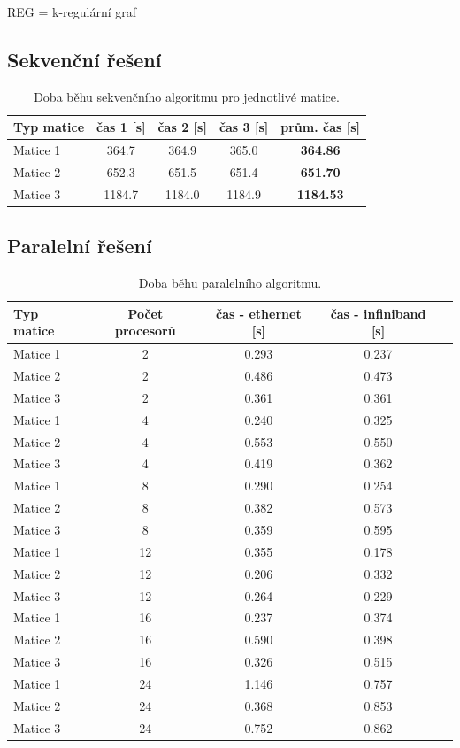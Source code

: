 \documentclass[12pt]{article}
\begin{document}
REG = k-regulární graf

\subsection{Sekvenční řešení}

\begin{table}[ht]
\centering
\begin{tabular}{|l|c|c|c|c|}
\hline \textbf{Typ matice} & \textbf{čas 1 [s]} & \textbf{čas 2 [s]} & \textbf{čas 3 [s]} & \textbf{prům. čas [s]} \\
\hline 
\hline Matice 1 & 364.7 & 364.9 & 365.0 & \textbf{364.86} \\ 
\hline Matice 2 & 652.3 & 651.5 & 651.4 & \textbf{651.70} \\ 
\hline Matice 3 & 1184.7 & 1184.0 & 1184.9 & \textbf{1184.53} \\ 
\hline 
\end{tabular}
\caption{Doba běhu sekvenčního algoritmu pro jednotlivé matice.}
\label{doba_behu_sekvencne}	
\end{table}

\newpage
\subsection{Paralelní řešení}
\begin{table}[ht]
\centering
\begin{tabular}{|l|c|c|c|c|}
\hline \textbf{Typ matice} & \textbf{Počet procesorů} & \textbf{čas - ethernet [s]} & \textbf{čas - infiniband [s]} \\
\hline 
\hline Matice 1 & 2 & 0.293 & 0.237 \\ 
\hline Matice 2 & 2 & 0.486 & 0.473 \\ 
\hline Matice 3 & 2 & 0.361 & 0.361 \\ 
\hline
\hline Matice 1 & 4 & 0.240 & 0.325 \\ 
\hline Matice 2 & 4 & 0.553 & 0.550 \\ 
\hline Matice 3 & 4 & 0.419 & 0.362 \\ 
\hline 
\hline Matice 1 & 8 & 0.290 & 0.254 \\ 
\hline Matice 2 & 8 & 0.382 & 0.573 \\ 
\hline Matice 3 & 8 & 0.359 & 0.595 \\ 
\hline 
\hline Matice 1 & 12 & 0.355 & 0.178 \\ 
\hline Matice 2 & 12 & 0.206 & 0.332 \\ 
\hline Matice 3 & 12 & 0.264 & 0.229 \\ 
\hline 
\hline Matice 1 & 16 & 0.237 & 0.374 \\ 
\hline Matice 2 & 16 & 0.590 & 0.398 \\ 
\hline Matice 3 & 16 & 0.326 & 0.515 \\ 
\hline 
\hline Matice 1 & 24 & 1.146 & 0.757 \\ 
\hline Matice 2 & 24 & 0.368 & 0.853 \\ 
\hline Matice 3 & 24 & 0.752 & 0.862 \\ 
\hline 
\end{tabular}
\caption{Doba běhu paralelního algoritmu.}
\label{doba_behu_paralelne}	
\end{table}
\end{document}
